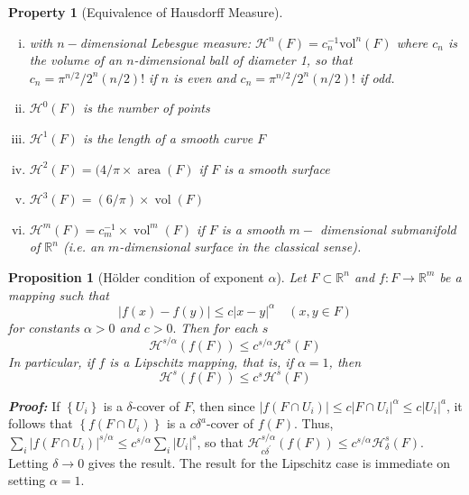 \documentclass[12pt, a4paper]{article}
\newtheorem{property}{Property}[subsection]
\newtheorem{proposition}{Proposition}[subsection]
\begin{document}
\begin{property}[Equivalence of Hausdorff Measure] $ $
    \begin{enumerate}[(i)]
        \item with $n-$dimensional Lebesgue measure: $\mathcal{H}^n(F) = c_n^{-1} \text{vol}^n(F)$ where $c_n$ is the volume of an $n$-dimensional ball of diameter 1, so that $c_{n}=\pi^{n / 2} / 2^{n}(n / 2) !$ if $n$ is even and $c_{n}=\pi^{n / 2} / 2^{n}(n / 2) !$ if odd.
        \item $\mathcal{H}^0(F)$ is the number of points
        \item $\mathcal{H}^1(F)$ is the length of a smooth curve $F$
        \item $\mathcal{H}^2(F) = (4/\pi\times \operatorname{area}(F)$ if $F$ is a smooth surface
        \item $\mathcal{H}^{3}(F)=(6 / \pi) \times \operatorname{vol}(F)$
        \item $\mathcal{H}^{m}(F)=c_{m}^{-1} \times \operatorname{vol}^{m}(F)$ if $F$ is a smooth $m-$
        dimensional submanifold of $\mathbb{R}^{n}$ (i.e. an $m$-dimensional surface in the classical sense).
    \end{enumerate}
\end{property}

\begin{proposition}[Hölder condition of exponent $\alpha$]\label{Haus-holder}
    Let $F \subset \mathbb{R}^{n}$ and $f: F \rightarrow \mathbb{R}^{m}$ be a mapping such that
$$
|f(x)-f(y)| \leq c|x-y|^{\alpha} \quad(x, y \in F)
$$
for constants $\alpha>0$ and $c>0 .$ Then for each $s$
$$
\mathcal{H}^{s / \alpha}(f(F)) \leq c^{s / \alpha} \mathcal{H}^{s}(F)
$$
In particular, if $f$ is a Lipschitz mapping, that is, if $\alpha=1$, then
$$
\mathcal{H}^{s}(f(F)) \leq c^{s} \mathcal{H}^{s}(F)
$$
\end{proposition}

\textbf{\textit{Proof:}} If $\left\{U_{i}\right\}$ is a $\delta$-cover of $F$, 
then since $\left|f\left(F \cap U_{i}\right)\right| \leq c\left|F \cap U_{i}\right|^{\alpha} \leq c\left|U_{i}\right|^{a}$, 
it follows that $\left\{f\left(F \cap U_{i}\right)\right\}$ is a $c \delta^{a}$-cover of $f(F)$. 
Thus, $\displaystyle\sum_{i}\left|f\left(F \cap U_{i}\right)\right|^{s / \alpha} \leq c^{s / \alpha} \sum_{i}\left|U_{i}\right|^{s}$, so that $\mathcal{H}_{c \delta^{\prime}}^{s / \alpha}(f(F)) \leq c^{s / \alpha} \mathcal{H}_{\delta}^{s}(F)$. Letting
$\delta \rightarrow 0$ gives the result. 
The result for the Lipschitz case is immediate on setting $\alpha=1$.
\end{document}
